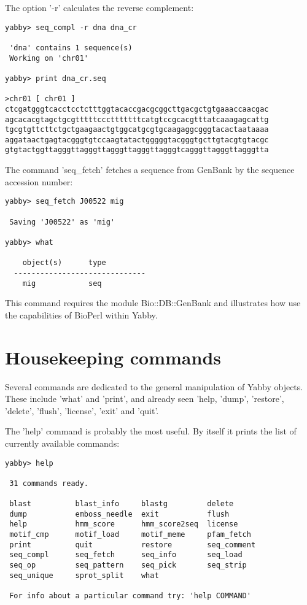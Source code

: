 The option '-r' calculates the reverse complement: 

\begin{verbatim}
yabby> seq_compl -r dna dna_cr

 'dna' contains 1 sequence(s)
 Working on 'chr01'

yabby> print dna_cr.seq

>chr01 [ chr01 ]
ctcgatgggtcacctcctctttggtacaccgacgcggcttgacgctgtgaaaccaacgac
agcacacgtagctgcgtttttccctttttttcatgtccgcacgtttatcaaagagcattg
tgcgtgttcttctgctgaagaactgtggcatgcgtgcaagaggcgggtacactaataaaa
aggataactgagtacgggtgtccaagtatactgggggtacgggtgcttgtacgtgtacgc
gtgtactggttagggttagggttagggttagggttagggtcagggttagggttagggtta
\end{verbatim}


The command 'seq\_fetch' fetches a sequence from GenBank
by the sequence accession number:

\begin{verbatim}
yabby> seq_fetch J00522 mig

 Saving 'J00522' as 'mig'

yabby> what

    object(s)      type
  ------------------------------
    mig            seq           
\end{verbatim}

This command requires the module Bio::DB::GenBank and illustrates
how use the capabilities of BioPerl \cite{bioperl} within Yabby.

\section{Housekeeping commands}


Several commands are dedicated to the general manipulation of
Yabby objects. These include 'what' and 'print', and already
seen 'help, 'dump', 'restore', 'delete', 'flush', 'license',
'exit' and 'quit'.

The 'help' command is probably the most useful. By itself it
prints the list of currently available commands: 

\begin{verbatim}
yabby> help

 31 commands ready.

 blast          blast_info     blastg         delete        
 dump           emboss_needle  exit           flush         
 help           hmm_score      hmm_score2seq  license       
 motif_cmp      motif_load     motif_meme     pfam_fetch    
 print          quit           restore        seq_comment   
 seq_compl      seq_fetch      seq_info       seq_load      
 seq_op         seq_pattern    seq_pick       seq_strip     
 seq_unique     sprot_split    what          

 For info about a particular command try: 'help COMMAND'
\end{verbatim}

